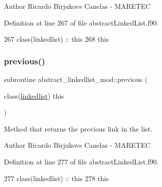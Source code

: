 \begin{DoxyAuthor}{Author}
Ricardo Birjukovs Canelas -\/ M\+A\+R\+E\+T\+EC 
\end{DoxyAuthor}


Definition at line 267 of file abstract\+Linked\+List.\+f90.


\begin{DoxyCode}
267     \textcolor{keywordtype}{class}(linkedlist) :: this
268     this%
\end{DoxyCode}
\mbox{\label{namespaceabstract__linkedlist__mod_a0b36d862899c5a40cb98bef4ffd5e2f4}} 
\subsubsection{\texorpdfstring{previous()}{previous()}}
{\footnotesize\ttfamily subroutine abstract\+\_\+linkedlist\+\_\+mod\+::previous (\begin{DoxyParamCaption}\item[{class(\mbox{\hyperlink{structabstract__linkedlist__mod_1_1linkedlist}{linkedlist}})}]{this }\end{DoxyParamCaption})\hspace{0.3cm}{\ttfamily [private]}}



Method that returns the previous link in the list. 

\begin{DoxyAuthor}{Author}
Ricardo Birjukovs Canelas -\/ M\+A\+R\+E\+T\+EC 
\end{DoxyAuthor}


Definition at line 277 of file abstract\+Linked\+List.\+f90.


\begin{DoxyCode}
277     \textcolor{keywordtype}{class}(linkedlist) :: this
278     this%
\end{DoxyCode}
\mbox{\label{namespaceabstract__linkedlist__mod_a9f4028744d1ca6536e28c76d2795ace3}} 
